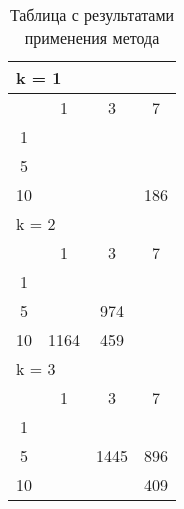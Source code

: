 \begin{table}
\label{sphere_results}
  \centering
    \begin{tabular}{|*4{c|}}
    \hline
    \multicolumn{4}{|l|}{k = 1} \\
    \hline
    \diagbox{$\mu$}{$\lambda$} & \multicolumn{1}{c|}{1} & \multicolumn{1}{c|}{3} & \multicolumn{1}{c|}{7} \\
    \hline
    1 & \cellcolor{olive}{2434} & \cellcolor{olive}{2207}& \cellcolor{olive}{878} \\
    \hline
    5 & \cellcolor{olive}{1450} & \cellcolor{olive}{569} & \cellcolor{olive}{368} \\
    \hline
    10 & \cellcolor{olive}{703} & \cellcolor{olive}{331} & 186 \\
    \hline
    \multicolumn{4}{|l|}{k = 2} \\
    \hline
    \diagbox{$\mu$}{$\lambda$} & \multicolumn{1}{c|}{1} & \multicolumn{1}{c|}{3} & \multicolumn{1}{c|}{7} \\
    \hline
    1 & \cellcolor{olive}{4342}& \cellcolor{olive}{2333}& \cellcolor{olive}{1464} \\
    \hline
    5 & \cellcolor{olive}{1891} & 974& \cellcolor{olive}{616} \\
    \hline
    10 & 1164 & 459& \cellcolor{olive}{188} \\
    \hline
    \multicolumn{4}{|l|}{k = 3} \\
    \hline
    \diagbox{$\mu$}{$\lambda$} & \multicolumn{1}{c|}{1} & \multicolumn{1}{c|}{3} & \multicolumn{1}{c|}{7} \\
    \hline
    1 & \cellcolor{olive}{8055}& \cellcolor{olive}{2826}& \cellcolor{olive}{1427} \\
    \hline
    5 & \cellcolor{olive}{2447} & 1445 & 896 \\
    \hline
    10 & \cellcolor{olive}{1996}& \cellcolor{olive}{1053} & 409 \\
  \hline
  \end{tabular}
  \captionsetup{justification=centering}
  \caption{Таблица с результатами применения метода }
\end{table}

